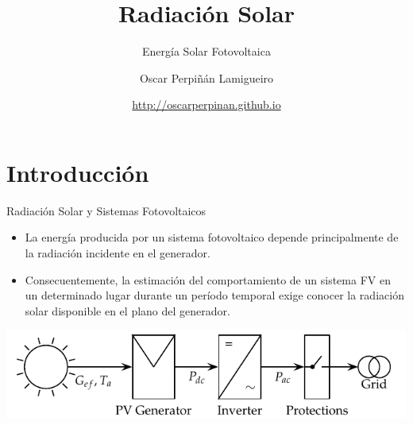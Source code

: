 \documentclass[xcolor={usenames,svgnames,dvipsnames}]{beamer}
\author{Oscar Perpiñán Lamigueiro}
\date{\url{http://oscarperpinan.github.io}}
\title{Radiación Solar}
\subtitle{Energía Solar Fotovoltaica}
\begin{document}
\maketitle

\section{Introducción}
\label{sec:orgf4b380f}

\begin{frame}[label={sec:orgf2ca954}]{Radiación Solar y Sistemas Fotovoltaicos}
\begin{itemize}
\item La \alert{energía producida} por un sistema fotovoltaico depende principalmente de la \alert{radiación incidente} en el generador.

\item Consecuentemente, la \alert{estimación del comportamiento} de un sistema FV en un determinado lugar durante un período temporal exige \alert{conocer la radiación solar disponible en el plano del generador}.
\end{itemize}

\begin{center}
\includegraphics[width=.9\linewidth]{../figs/GCPVScheme.pdf}
\end{center}
\end{frame}
\end{document}
